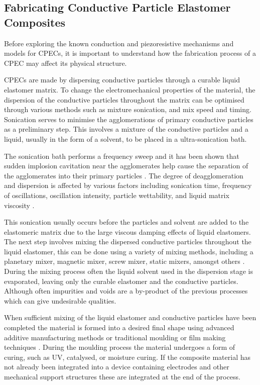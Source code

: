 \subsection{Fabricating Conductive Particle Elastomer Composites}
\label{subsec:Fabricating Conductive Particle Elastomer Composites}
Before exploring the known conduction and piezoresistive mechanisms and models for CPECs, it is important to understand how the fabrication process of a CPEC may affect its physical structure. 

CPECs are made by dispersing conductive particles through a curable liquid elastomer matrix. To change the electromechanical properties of the material, the dispersion of the conductive particles throughout the matrix can be optimised through various methods such as mixture sonication, and mix speed and timing. Sonication serves to minimise the agglomerations of primary conductive particles as a preliminary step. This involves a mixture of the conductive particles and a liquid, usually in the form of a solvent, to be placed in a ultra-sonication bath. 

The sonication bath performs a frequency sweep and it has been shown that sudden implosion cavitation near the agglomerates help cause the separation of the agglomerates into their primary particles \cite{Priyadarshi2021,Kudryashova2019}. The degree of deagglomeration and dispersion is affected by various factors including sonication time, frequency of oscillations, oscillation intensity, particle wettability, and liquid matrix viscosity \cite{Kudryashova2019,Chen2020a}. 

This sonication usually occurs before the particles and solvent are added to the elastomeric matrix due to the large viscous damping effects of liquid elastomers. The next step involves mixing the dispersed conductive particles throughout the liquid elastomer, this can be done using a variety of mixing methods, including a planetary mixer, magnetic mixer, screw mixer, static mixers, amongst others \cite{Pegel2008,Rosset2016,Fekiri2020,Kim2012}. During the mixing process often the liquid solvent used in the dispersion stage is evaporated, leaving only the curable elastomer and the conductive particles. Although often impurities and voids are a by-product of the previous processes which can give undesirable qualities.

When sufficient mixing of the liquid elastomer and conductive particles have been completed the material is formed into a desired final shape using advanced additive manufacturing methods \cite{Bastola2018,Sapra2023,Krueger2014,Li2020,McCoul2017,Yi2023,Park2018} or traditional moulding \cite{Kim2018} or film making techniques \cite{Fasolt2017}. During the moulding process the material undergoes a form of curing, such as UV, catalysed, or moisture curing. If the composite material has not already been integrated into a device containing electrodes and other mechanical support structures these are integrated at the end of the process.


